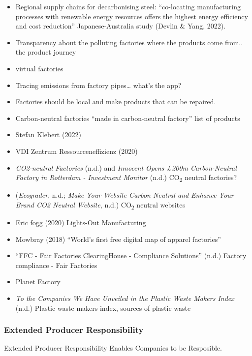 \documentclass[
  letterpaper,
  DIV=11,
  numbers=noendperiod]{scrartcl}
\begin{document}
\begin{itemize}
\item
  Regional supply chains for decarbonising steel: ``co-locating
  manufacturing processes with renewable energy resources offers the
  highest energy efficiency and cost reduction'' Japanese-Australia
  study (Devlin \& Yang, 2022).
\item
  Transparency about the polluting factories where the products come
  from.. the product journey
\item
  virtual factories
\item
  Tracing emissions from factory pipes\ldots{} what's the app?
\item
  Factories should be local and make products that can be repaired.
\item
  Carbon-neutral factories ``made in carbon-neutral factory'' list of
  products
\item
  Stefan Klebert (2022)
\item
  VDI Zentrum Ressourceneffizienz (2020)
\item
  \emph{{CO2-neutral} Factories} (n.d.) and \emph{Innocent Opens {£}200m
  Carbon-Neutral Factory in {Rotterdam} - {Investment Monitor}} (n.d.)
  CO\textsubscript{2} neutral factories?
\item
  (\emph{Ecograder}, n.d.; \emph{Make Your Website Carbon Neutral and
  Enhance Your Brand {\textbar} {CO2 Neutral Website}}, n.d.)
  CO\textsubscript{2} neutral websites
\item
  Eric fogg (2020) Lights-Out Manufacturing
\item
  Mowbray (2018) ``World's first free digital map of apparel factories''
\item
  {``{FFC} - {Fair Factories ClearingHouse} - {Compliance Solutions}''}
  (n.d.) Factory compliance - Fair Factories
\item
  Planet Factory
\item
  \emph{To the Companies We Have Unveiled in the {Plastic Waste Makers
  Index}} (n.d.) Plastic waste makers index, sources of plastic waste
\end{itemize}

\subsubsection{Extended Producer
Responsibility}\label{extended-producer-responsibility}

Extended Producer Responsibility Enables Companies to be Resposible.
\end{document}
